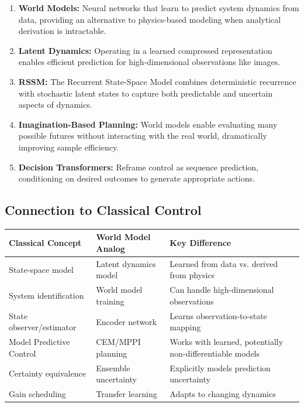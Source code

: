 \begin{enumerate}
    \item \textbf{World Models:} Neural networks that learn to predict system dynamics from data, providing an alternative to physics-based modeling when analytical derivation is intractable.

    \item \textbf{Latent Dynamics:} Operating in a learned compressed representation enables efficient prediction for high-dimensional observations like images.

    \item \textbf{RSSM:} The Recurrent State-Space Model combines deterministic recurrence with stochastic latent states to capture both predictable and uncertain aspects of dynamics.

    \item \textbf{Imagination-Based Planning:} World models enable evaluating many possible futures without interacting with the real world, dramatically improving sample efficiency.

    \item \textbf{Decision Transformers:} Reframe control as sequence prediction, conditioning on desired outcomes to generate appropriate actions.
\end{enumerate}

\subsection{Connection to Classical Control}

\begin{center}
\begin{tabular}{p{4cm}p{4cm}p{6cm}}
\toprule
\textbf{Classical Concept} & \textbf{World Model Analog} & \textbf{Key Difference} \\
\midrule
State-space model & Latent dynamics model & Learned from data vs. derived from physics \\
System identification & World model training & Can handle high-dimensional observations \\
State observer/estimator & Encoder network & Learns observation-to-state mapping \\
Model Predictive Control & CEM/MPPI planning & Works with learned, potentially non-differentiable models \\
Certainty equivalence & Ensemble uncertainty & Explicitly models prediction uncertainty \\
Gain scheduling & Transfer learning & Adapts to changing dynamics \\
\bottomrule
\end{tabular}
\end{center}

